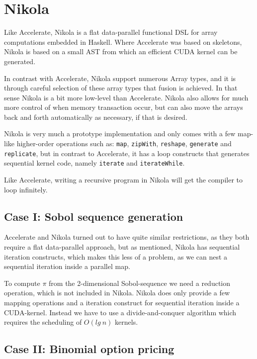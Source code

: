 \documentclass[preprint]{sigplanconf}
\begin{document}
\section{Nikola}
Like Accelerate, Nikola is a flat data-parallel functional DSL for
array computations embedded in Haskell. Where Accelerate was based on
skeletons, Nikola is based on a small AST from which an efficient CUDA
kernel can be generated.

In contrast with Accelerate, Nikola support numerous Array types, and
it is through careful selection of these array types that fusion is
achieved. In that sense Nikola is a bit more low-level than
Accelerate. Nikola also allows for much more control of when memory
transaction occur, but can also move the arrays back and forth
automatically as necessary, if that is desired.

Nikola is very much a prototype implementation and only comes with a
few map-like higher-order operations such as: \verb|map|,
\verb|zipWith|, \verb|reshape|, \verb|generate| and \verb|replicate|,
but in contrast to Accelerate, it has a loop constructs that generates
sequential kernel code, namely \verb|iterate| and \verb|iterateWhile|.

Like Accelerate, writing a recursive program in Nikola will get the
compiler to loop infinitely.

\subsection{Case I: Sobol sequence generation}
Accelerate and Nikola turned out to have quite similar restrictions,
as they both require a flat data-parallel approach, but as mentioned,
Nikola has sequential iteration constructs, which makes this less of a
problem, as we can nest a sequential iteration inside a parallel map.

To compute $\pi$ from the 2-dimensional Sobol-sequence we need
a reduction operation, which is not included in Nikola. Nikola does
only provide a few mapping operations and a iteration construct for
sequential iteration inside a CUDA-kernel. Instead we have to use a
divide-and-conquer algorithm which requires the scheduling of
$O(lg~n)$ kernels.

\subsection{Case II: Binomial option pricing}

\end{document}
